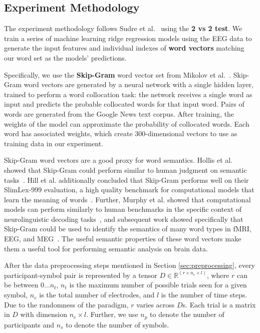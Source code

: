 \subsection{Experiment Methodology}
  \label{sec:methodology}
  The experiment methodology follows Sudre et al.~\cite{Sudre2012} using the {\bf 2 vs 2 test}. We train a series of machine learning ridge regression models using the EEG data to generate the input features and individual indexes of {\bf word vectors} matching our word set as the models' predictions.
  
  Specifically, we use the {\bf Skip-Gram} word vector set from Mikolov et al.~\cite{Mikolov2013}. Skip-Gram word vectors are generated by a neural network with a single hidden layer, trained to perform a word collocation task: the network receives a single word as input and predicts the probable collocated words for that input word. Pairs of words are generated from the Google News text corpus. After training, the weights of the model can approximate the probability of collocated words. Each word has associated weights, which create 300-dimensional vectors to use as training data in our experiment.
  
   Skip-Gram word vectors are a good proxy for word semantics. Hollis et al. showed that Skip-Gram could perform similar to human judgment on semantic tasks~\cite{hollis2017extrapolating}. Hill et al. additionally concluded that Skip-Gram performs well on their SlimLex-999 evaluation, a high quality benchmark for computational models that learn the meaning of words~\cite{hill2016simlex}. Further, Murphy et al. showed that computational models can perform similarly to human benchmarks in the specific context of neurolinguistic decoding tasks~\cite{Murphy2012}, and subsequent work showed specifically that Skip-Gram could be used to identify the semantics of many word types in fMRI, EEG, and MEG~\cite{xu2016brainbench}. The useful semantic properties of these word vectors make them a useful tool for performing semantic analysis on brain data.
     
  After the data preprocessing steps mentioned in Section \ref{sec:preprocessing}, every participant-symbol pair is represented by a tensor $D \in \mathbb{R}^{(r \times n_e \times l)}$, where $r$ can be between $0 \ldots n_t$, $n_t$ is the maximum number of possible trials seen for a given symbol, $n_e$ is the total number of electrodes, and $l$ is the number of time steps. Due to the randomness of the paradigm, $r$ varies across $D$s. Each trial is a matrix in $D$ with dimension $n_e \times l$. Further, we use $n_p$ to denote the number of participants and $n_s$ to denote the number of symbols. 
  
